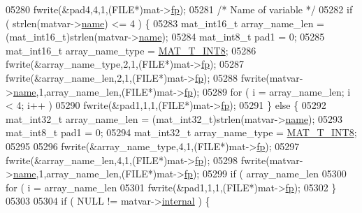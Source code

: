 \begin{DoxyCode}
{{{{{{{{{{{{{{{{{{{{{{{{{{{{{{{05280             fwrite(&pad4,4,1,(FILE*)mat->\hyperlink{struct__mat__t_a85f562e407ca9ad4d2a6e14f839432b7}{fp});
05281         \textcolor{comment}{/* Name of variable */}
05282         \textcolor{keywordflow}{if} ( strlen(matvar->\hyperlink{group___m_a_t_a5d4b55b041e3b4fb50c04337f05ad909}{name}) <= 4 ) \{
05283             mat\_int16\_t array\_name\_len = (mat\_int16\_t)strlen(matvar->\hyperlink{group___m_a_t_a5d4b55b041e3b4fb50c04337f05ad909}{name});
05284             mat\_int8\_t  pad1 = 0;
05285             mat\_int16\_t array\_name\_type = \hyperlink{group___m_a_t_ggacf7b3b879282b7ab3a51190e49bf3453a9807f5033ed4f9b548953742d9fd1658}{MAT\_T\_INT8};
05286             fwrite(&array\_name\_type,2,1,(FILE*)mat->\hyperlink{struct__mat__t_a85f562e407ca9ad4d2a6e14f839432b7}{fp});
05287             fwrite(&array\_name\_len,2,1,(FILE*)mat->\hyperlink{struct__mat__t_a85f562e407ca9ad4d2a6e14f839432b7}{fp});
05288             fwrite(matvar->\hyperlink{group___m_a_t_a5d4b55b041e3b4fb50c04337f05ad909}{name},1,array\_name\_len,(FILE*)mat->\hyperlink{struct__mat__t_a85f562e407ca9ad4d2a6e14f839432b7}{fp});
05289             \textcolor{keywordflow}{for} ( i = array\_name\_len; i < 4; i++ )
05290                 fwrite(&pad1,1,1,(FILE*)mat->\hyperlink{struct__mat__t_a85f562e407ca9ad4d2a6e14f839432b7}{fp});
05291         \} \textcolor{keywordflow}{else} \{
05292             mat\_int32\_t array\_name\_len = (mat\_int32\_t)strlen(matvar->\hyperlink{group___m_a_t_a5d4b55b041e3b4fb50c04337f05ad909}{name});
05293             mat\_int8\_t  pad1 = 0;
05294             mat\_int32\_t array\_name\_type = \hyperlink{group___m_a_t_ggacf7b3b879282b7ab3a51190e49bf3453a9807f5033ed4f9b548953742d9fd1658}{MAT\_T\_INT8};
05295 
05296             fwrite(&array\_name\_type,4,1,(FILE*)mat->\hyperlink{struct__mat__t_a85f562e407ca9ad4d2a6e14f839432b7}{fp});
05297             fwrite(&array\_name\_len,4,1,(FILE*)mat->\hyperlink{struct__mat__t_a85f562e407ca9ad4d2a6e14f839432b7}{fp});
05298             fwrite(matvar->\hyperlink{group___m_a_t_a5d4b55b041e3b4fb50c04337f05ad909}{name},1,array\_name\_len,(FILE*)mat->\hyperlink{struct__mat__t_a85f562e407ca9ad4d2a6e14f839432b7}{fp});
05299             \textcolor{keywordflow}{if} ( array\_name\_len %
05300                 \textcolor{keywordflow}{for} ( i = array\_name\_len %
05301                     fwrite(&pad1,1,1,(FILE*)mat->\hyperlink{struct__mat__t_a85f562e407ca9ad4d2a6e14f839432b7}{fp});
05302         \}
05303 
05304         \textcolor{keywordflow}{if} ( NULL != matvar->\hyperlink{group___m_a_t_a6e97e3ed9f40c49322c18561c2a94e92}{internal} ) \{
}}}}}}}}}}}}}}}}}}}}}}}}}}}}}}}
\end{DoxyCode}

